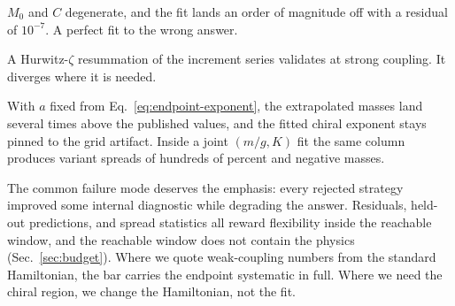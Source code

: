 \begin{description}
  $M_0$ and $C$ degenerate, and the fit lands an order of magnitude off
  with a residual of $10^{-7}$.  A perfect fit to the wrong answer.
\item[Summing the tail analytically.]  A Hurwitz-$\zeta$ resummation of the
  increment series validates at strong coupling.  It diverges where it is
  needed.
\item[Adding an explicit $K^{-a}$ column.]  With $a$ fixed from
  Eq.~\eqref{eq:endpoint-exponent}, the extrapolated masses land several
  times above the published values, and the fitted chiral exponent stays
  pinned to the grid artifact.  Inside a joint $(m/g, K)$ fit the same
  column produces variant spreads of hundreds of percent and negative
  masses.
\end{description}

The common failure mode deserves the emphasis: every rejected strategy
improved some internal diagnostic while degrading the answer.  Residuals,
held-out predictions, and spread statistics all reward flexibility inside
the reachable window, and the reachable window does not contain the physics
(Sec.~\ref{sec:budget}).  Where we quote weak-coupling numbers from the
standard Hamiltonian, the bar carries the endpoint systematic in full.
Where we need the chiral region, we change the Hamiltonian, not the fit.
